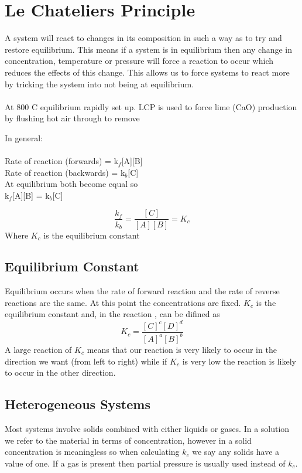 \documentclass[a4paper, 12pt]{article}
\begin{document}
\newpage

\section{Le Chateliers Principle}
	A system will react to changes in its composition in such a way as to try and restore equilibrium. This means if a system is in equilibrium then any change in concentration, temperature or pressure will force a reaction to occur which reduces the effects of this change. This allows us to force systems to react more by tricking the system into not being at equilibrium. \\
	 \\
	At 800 \degree C equilibrium rapidly set up. LCP is used to force lime (CaO) production by flushing hot air through to remove  \\
	\par
	In general: \\
	 \\
	Rate of reaction (forwards) = k$_f$[A][B] \\
	Rate of reaction (backwards) = k$_b$[C] \\
	At equilibrium both become equal so \\
	k$_f$[A][B] = k$_b$[C] \\
	\par
	\[ \frac{k_f}{k_b} = \frac{[C]}{[A][B]} = K_c \]
	Where $K_c$ is the equilibrium constant
	
	\subsection{Equilibrium Constant}
		Equilibrium occurs when the rate of forward reaction and the rate of reverse reactions are the same. At this point the concentrations are fixed. $K_c$ is the equilibrium constant and, in the reaction , can be difined as 
		\[ K_c = \frac{[C]^c[D]^d}{[A]^a[B]^b} \]
		A large reaction of $K_c$ means that our reaction is very likely to occur in the direction we want (from left to right) while if $K_c$ is very low the reaction is likely to occur in the other direction.
	
	\subsection{Heterogeneous Systems}
		Most systems involve solids combined with either liquids or gases. In a solution we refer to the material in terms of concentration, however in a solid concentration is meaningless so when calculating $k_c$ we say any solids have a value of one. If a gas is present then partial pressure is usually used instead of $k_c$.
		
\end{document}
